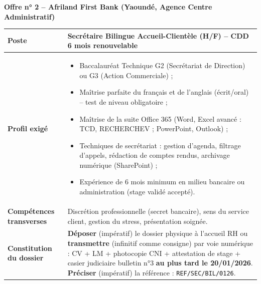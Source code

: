 \documentclass[11pt]{article}
\begin{document}
\medskip
\noindent
\textbf{Offre n° 2 -- Afriland First Bank (Yaoundé, Agence Centre Administratif)}
\begin{center}
\begin{tabularx}{\linewidth}{|l|X|}\hline
\textbf{Poste} & Secrétaire Bilingue Accueil-Clientèle (H/F) -- CDD 6 mois renouvelable \\ \hline
\textbf{Profil exigé} & \begin{itemize}\item Baccalauréat Technique G2 (Secrétariat de Direction) ou G3 (Action Commerciale) ;\item Maîtrise parfaite du français et de l'anglais (écrit/oral) -- test de niveau obligatoire ;\item Maîtrise de la suite Office 365 (Word, Excel avancé : TCD, RECHERCHEV ; PowerPoint, Outlook) ;\item Techniques de secrétariat : gestion d'agenda, filtrage d'appels, rédaction de comptes rendus, archivage numérique (SharePoint) ;\item Expérience de 6 mois minimum en milieu bancaire ou administration (stage validé accepté).\end{itemize} \\ \hline
\textbf{Compétences transverses} & Discrétion professionnelle (secret bancaire), sens du service client, gestion du stress, présentation soignée. \\ \hline
\textbf{Constitution du dossier} & \textbf{Déposer} (impératif) le dossier physique à l'accueil RH ou \textbf{transmettre} (infinitif comme consigne) par voie numérique : CV + LM + photocopie CNI + attestation de stage + casier judiciaire bulletin n°3 \textbf{au plus tard le 20/01/2026}. \textbf{Préciser} (impératif) la référence : \texttt{REF/SEC/BIL/0126}. \\ \hline
\end{tabularx}
\end{center}
\end{document}
